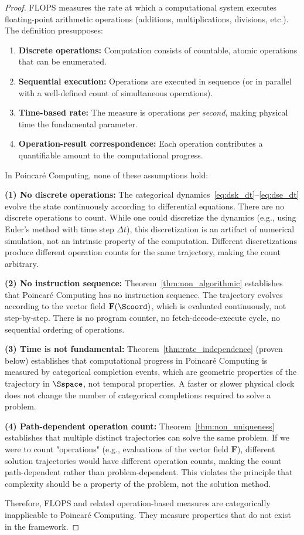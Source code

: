 \begin{proof}
FLOPS measures the rate at which a computational system executes floating-point arithmetic operations (additions, multiplications, divisions, etc.). The definition presupposes:
\begin{enumerate}
    \item \textbf{Discrete operations:} Computation consists of countable, atomic operations that can be enumerated.
    \item \textbf{Sequential execution:} Operations are executed in sequence (or in parallel with a well-defined count of simultaneous operations).
    \item \textbf{Time-based rate:} The measure is operations \textit{per second}, making physical time the fundamental parameter.
    \item \textbf{Operation-result correspondence:} Each operation contributes a quantifiable amount to the computational progress.
\end{enumerate}

In Poincaré Computing, none of these assumptions hold:

\textbf{(1) No discrete operations:} The categorical dynamics~\eqref{eq:dsk_dt}--\eqref{eq:dse_dt} evolve the state continuously according to differential equations. There are no discrete operations to count. While one could discretize the dynamics (e.g., using Euler's method with time step $\Delta t$), this discretization is an artifact of numerical simulation, not an intrinsic property of the computation. Different discretizations produce different operation counts for the same trajectory, making the count arbitrary.

\textbf{(2) No instruction sequence:} Theorem~\ref{thm:non_algorithmic} establishes that Poincaré Computing has no instruction sequence. The trajectory evolves according to the vector field $\mathbf{F}(\Scoord)$, which is evaluated continuously, not step-by-step. There is no program counter, no fetch-decode-execute cycle, no sequential ordering of operations.

\textbf{(3) Time is not fundamental:} Theorem~\ref{thm:rate_independence} (proven below) establishes that computational progress in Poincaré Computing is measured by categorical completion events, which are geometric properties of the trajectory in $\Sspace$, not temporal properties. A faster or slower physical clock does not change the number of categorical completions required to solve a problem.

\textbf{(4) Path-dependent operation count:} Theorem~\ref{thm:non_uniqueness} establishes that multiple distinct trajectories can solve the same problem. If we were to count "operations" (e.g., evaluations of the vector field $\mathbf{F}$), different solution trajectories would have different operation counts, making the count path-dependent rather than problem-dependent. This violates the principle that complexity should be a property of the problem, not the solution method.

Therefore, FLOPS and related operation-based measures are categorically inapplicable to Poincaré Computing. They measure properties that do not exist in the framework.
\end{proof}

